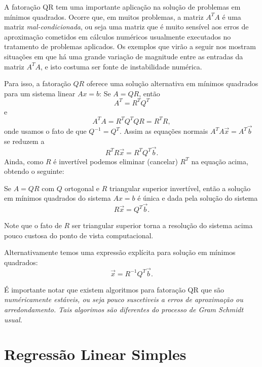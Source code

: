 \documentclass[../livro.tex]{subfiles}  %
\begin{document}
A fatoração QR tem uma importante aplicação na solução de problemas em mínimos quadrados. Ocorre que, em muitos problemas, a matriz $A^T A$ é uma matriz {\it mal-condicionada}, ou seja uma matriz que é muito sensível aos erros de aproximação cometidos em cálculos numéricos usualmente executados no tratamento de problemas aplicados. 
Os exemplos que virão a seguir nos mostram situações em que há uma grande variação de magnitude entre as entradas da matriz $A^T A$, e isto costuma ser fonte de instabilidade numérica.

Para isso, a fatoração $QR$ oferece uma solução alternativa em mínimos quadrados para um sistema linear $Ax=b$:
Se $A=QR$, então 
\begin{equation}
A^T=R^T Q^T\end{equation}
e
\begin{equation}  A^T A= R^T Q^T Q R= R^T R,
\end{equation} 
onde usamos o fato de que $Q^{-1}=Q^T$.
Assim as equações normais $A^T A \vec{x} = A^T \vec{b}$ se reduzem a 
\begin{equation} R^T R \vec{x} = R^T Q^T \vec{b}.\end{equation}
Ainda, como $R$ é invertível podemos eliminar (cancelar) $R^T$ na equação acima, %
obtendo o seguinte:
\begin{theorem}
  Se $A=QR$ com $Q$ ortogonal e $R$ triangular superior invertível, então 
  a solução em mínimos quadrados do sistema $Ax=b$ é única e dada pela solução do sistema
  \begin{equation}  R \vec{x} =  Q^T \vec{b}.\end{equation}
\end{theorem}

Note que o fato de $R$ ser triangular superior torna a resolução do sistema acima pouco custosa do ponto de vista computacional.

Alternativamente temos uma expressão explícita para solução em mínimos quadrados: \begin{equation}   \vec{x} = R^{-1} Q^T \vec{b}.\end{equation}

É importante notar que existem algoritmos para fatoração QR que são \it{numéricamente estáveis}, ou seja pouco suscetiveis a erros de aproximação ou arredondamento. Tais algorimos são diferentes do processo de Gram Schmidt usual.


\section{Regressão Linear Simples}
\end{document}
